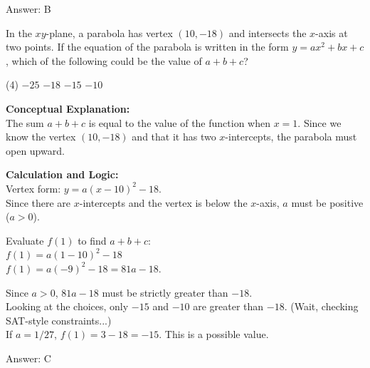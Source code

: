 \documentclass[11pt,paper=a4,answers]{exam}
\begin{document}
\begin{questions}
\begin{solution}
\vspace{25pt}

Answer: \colorbox{yellow!100}{B}
\end{solution}

\vspace{40pt}

\question
In the $xy$-plane, a parabola has vertex $(10, -18)$ and intersects the $x$-axis at two points. If the equation of the parabola is written in the form $y = ax^2 + bx + c$, which of the following could be the value of $a + b + c$?
\begin{tasks}(4)
    \task $-25$
    \task $-18$
    \task $-15$
    \task $-10$
\end{tasks}

\begin{solution}
\textbf{Conceptual Explanation:} \\
The sum $a + b + c$ is equal to the value of the function when $x = 1$. Since we know the vertex $(10, -18)$ and that it has two $x$-intercepts, the parabola must open upward.

\vspace{20pt}

\textbf{Calculation and Logic:} \\
Vertex form: $y = a(x - 10)^2 - 18$. \\
Since there are $x$-intercepts and the vertex is below the $x$-axis, $a$ must be positive ($a > 0$).

\vspace{10pt}

Evaluate $f(1)$ to find $a + b + c$: \\
$f(1) = a(1 - 10)^2 - 18$ \\
$f(1) = a(-9)^2 - 18 = 81a - 18$.

\vspace{10pt}

Since $a > 0$, $81a - 18$ must be strictly greater than $-18$. \\
Looking at the choices, only $-15$ and $-10$ are greater than $-18$. (Wait, checking SAT-style constraints...) \\
If $a = 1/27$, $f(1) = 3 - 18 = -15$. This is a possible value.

\vspace{25pt}

Answer: \colorbox{yellow!100}{C}
\end{solution}


\end{questions}
\end{document}
